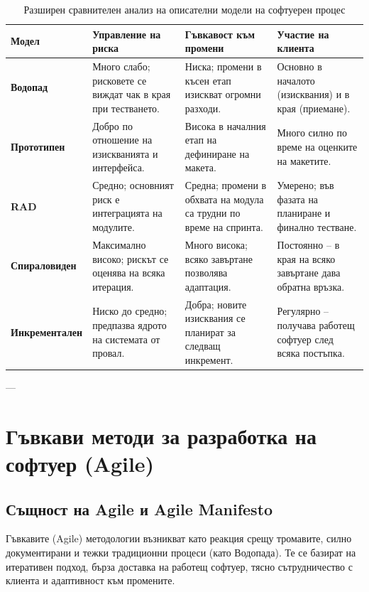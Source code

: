 \documentclass{scrartcl}
\begin{document}
\begin{FlushLeft}
\begin{table}[H]
\caption{Разширен сравнителен анализ на описателни модели на софтуерен процес}
\label{tab:detailed-process-models}
\small
\begin{tabularx}{\textwidth}{p{2.3cm} X X p{2.6cm}}
\toprule
\textbf{Модел} & \textbf{Управление на риска} & \textbf{Гъвкавост към промени} & \textbf{Участие на клиента} \\ 
\midrule
\textbf{Водопад} & Много слабо; рисковете се виждат чак в края при тестването. & Ниска; промени в късен етап изискват огромни разходи. & Основно в началото (изисквания) и в края (приемане). \\ \addlinespace
\textbf{Прототипен} & Добро по отношение на изискванията и интерфейса. & Висока в началния етап на дефиниране на макета. & Много силно по време на оценките на макетите. \\ \addlinespace
\textbf{RAD} & Средно; основният риск е интеграцията на модулите. & Средна; промени в обхвата на модула са трудни по време на спринта. & Умерено; във фазата на планиране и финално тестване. \\ \addlinespace
\textbf{Спираловиден} & Максимално високо; рискът се оценява на всяка итерация. & Много висока; всяко завъртане позволява адаптация. & Постоянно – в края на всяко завъртане дава обратна връзка. \\ \addlinespace
\textbf{Инкрементален} & Ниско до средно; предпазва ядрото на системата от провал. & Добра; новите изисквания се планират за следващ инкремент. & Регулярно – получава работещ софтуер след всяка постъпка. \\ 
\bottomrule
\end{tabularx}
\end{table}

---

\section{Гъвкави методи за разработка на софтуер (Agile)}

\subsection{Същност на Agile и Agile Manifesto}
Гъвкавите (Agile) методологии възникват като реакция срещу тромавите, силно документирани и тежки традиционни процеси (като Водопада). Те се базират на итеративен подход, бърза доставка на работещ софтуер, тясно сътрудничество с клиента и адаптивност към промените.


\end{FlushLeft}
\end{document}
